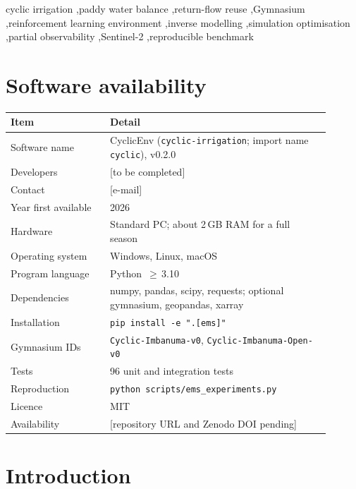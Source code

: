 \documentclass[preprint,12pt,authoryear,review]{elsarticle}
\begin{document}
\begin{frontmatter}
\begin{keyword}
cyclic irrigation \sep paddy water balance \sep return-flow reuse \sep Gymnasium \sep reinforcement learning environment \sep inverse modelling \sep simulation optimisation \sep partial observability \sep Sentinel-2 \sep reproducible benchmark
\end{keyword}

\end{frontmatter}

\section*{Software availability}
\begin{table}[htbp]
\centering
\small
\begin{tabular}{p{0.28\linewidth}p{0.62\linewidth}}
\toprule
Item & Detail \\
\midrule
Software name & CyclicEnv (\texttt{cyclic-irrigation}; import name \texttt{cyclic}), v0.2.0 \\
Developers & [to be completed] \\
Contact & [e-mail] \\
Year first available & 2026 \\
Hardware & Standard PC; about 2\,GB RAM for a full season \\
Operating system & Windows, Linux, macOS \\
Program language & Python~$\geq$\,3.10 \\
Dependencies & numpy, pandas, scipy, requests; optional gymnasium, geopandas, xarray \\
Installation & \texttt{pip install -e ".[ems]"} \\
Gymnasium IDs & \texttt{Cyclic-Imbanuma-v0}, \texttt{Cyclic-Imbanuma-Open-v0} \\
Tests & 96 unit and integration tests \\
Reproduction & \texttt{python scripts/ems\_experiments.py} \\
Licence & MIT \\
Availability & [repository URL and Zenodo DOI pending] \\
\bottomrule
\end{tabular}
\end{table}

\section{Introduction}
\label{sec:intro}
\end{document}
